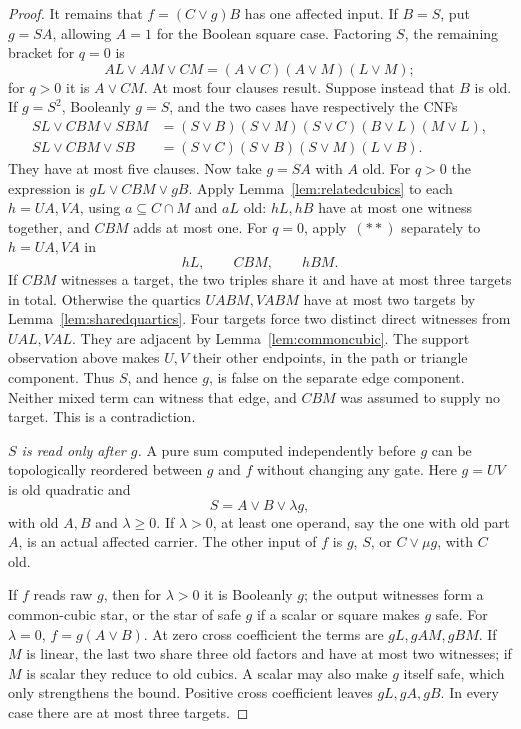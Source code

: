 \documentclass[11pt]{article}
\theoremstyle{definition}
\theoremstyle{remark}
\begin{document}
\begin{proof}
It remains that $f=(C\vee g)B$ has one affected input. If $B=S$, put $g=SA$, allowing $A=1$ for the Boolean square case. Factoring $S$, the remaining bracket for $q=0$ is
\[
 AL\vee AM\vee CM=(A\vee C)(A\vee M)(L\vee M);
\]
for $q>0$ it is $A\vee CM$. At most four clauses result. Suppose instead that $B$ is old. If $g=S^2$, Booleanly $g=S$, and the two cases have respectively the CNFs
\[
\begin{split}
 SL\vee CBM\vee SBM
  &=(S\vee B)(S\vee M)(S\vee C)(B\vee L)(M\vee L),\\
 SL\vee CBM\vee SB
  &=(S\vee C)(S\vee B)(S\vee M)(L\vee B).
\end{split}
\]
They have at most five clauses. Now take $g=SA$ with $A$ old. For $q>0$ the expression is $gL\vee CBM\vee gB$. Apply Lemma~\ref{lem:relatedcubics} to each $h=UA,VA$, using $a\subseteq C\cap M$ and $aL$ old: $hL,hB$ have at most one witness together, and $CBM$ adds at most one. For $q=0$, apply~$(**)$ separately to $h=UA,VA$ in
\[
 hL,\qquad CBM,\qquad hBM.
\]
If $CBM$ witnesses a target, the two triples share it and have at most three targets in total. Otherwise the quartics $UABM,VABM$ have at most two targets by Lemma~\ref{lem:sharedquartics}. Four targets force two distinct direct witnesses from $UAL,VAL$. They are adjacent by Lemma~\ref{lem:commoncubic}. The support observation above makes $U,V$ their other endpoints, in the path or triangle component. Thus $S$, and hence $g$, is false on the separate edge component. Neither mixed term can witness that edge, and $CBM$ was assumed to supply no target. This is a contradiction.

\emph{$S$ is read only after $g$.} A pure sum computed independently before $g$ can be topologically reordered between $g$ and $f$ without changing any gate. Here $g=UV$ is old quadratic and
\[
 S=A\vee B\vee\lambda g,
\]
with old $A,B$ and $\lambda\ge0$. If $\lambda>0$, at least one operand, say the one with old part $A$, is an actual affected carrier. The other input of $f$ is $g$, $S$, or $C\vee\mu g$, with $C$ old.

If $f$ reads raw $g$, then for $\lambda>0$ it is Booleanly $g$; the output witnesses form a common-cubic star, or the star of safe $g$ if a scalar or square makes $g$ safe. For $\lambda=0$, $f=g(A\vee B)$. At zero cross coefficient the terms are $gL,gAM,gBM$. If $M$ is linear, the last two share three old factors and have at most two witnesses; if $M$ is scalar they reduce to old cubics. A scalar may also make $g$ itself safe, which only strengthens the bound. Positive cross coefficient leaves $gL,gA,gB$. In every case there are at most three targets.


\end{proof}
\end{document}
